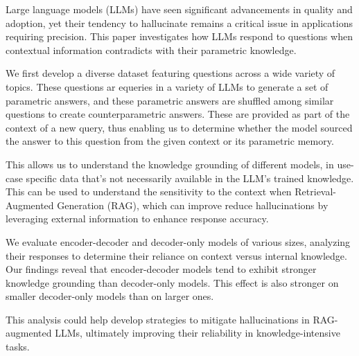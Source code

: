 Large language models (LLMs) have seen significant advancements in quality and adoption, yet their tendency to hallucinate remains a critical issue in applications requiring precision.
This paper investigates how LLMs respond to questions when contextual information contradicts with their parametric knowledge.

We first develop a diverse dataset featuring questions across a wide variety of topics.
These questions ar equeries in a variety of LLMs to generate a set of parametric answers, and these parametric answers are shuffled among similar questions to create counterparametric answers.
These are provided as part of the context of a new query, thus enabling us to determine whether the model sourced the answer to this question from the given context or its parametric memory.

This allows us to understand the knowledge grounding of different models, in use-case specific data that's not necessarily available in the LLM's trained knowledge.
This can be used to understand the sensitivity to the context when Retrieval-Augmented Generation (RAG), which can improve reduce hallucinations by leveraging external information to enhance response accuracy.

We evaluate encoder-decoder and decoder-only models of various sizes, analyzing their responses to determine their reliance on context versus internal knowledge.
Our findings reveal that encoder-decoder models tend to exhibit stronger knowledge grounding than decoder-only models.
This effect is also stronger on smaller decoder-only models than on larger ones.

This analysis could help develop strategies to mitigate hallucinations in RAG-augmented LLMs, ultimately improving their reliability in knowledge-intensive tasks.
